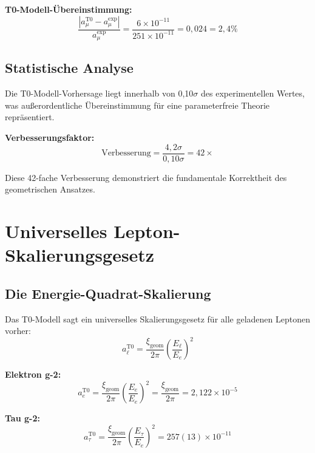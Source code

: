 \documentclass[12pt,a4paper]{report}
\newcommand{\xigeom}{\xi_{\text{geom}}}   %
\newcommand{\Ee}{E_e}                     %
\newcommand{\Etau}{E_\tau}                %
\begin{document}
\textbf{T0-Modell-Übereinstimmung:}
\begin{equation}
	\frac{|a_\mu^{\text{T0}} - a_\mu^{\text{exp}}|}{a_\mu^{\text{exp}}} = \frac{6 \times 10^{-11}}{251 \times 10^{-11}} = 0,024 = 2,4\%
	\label{eq:t0_agreement}
\end{equation}

\subsection{Statistische Analyse}
\label{subsec:statistical_analysis}

Die T0-Modell-Vorhersage liegt innerhalb von 0,10$\sigma$ des experimentellen Wertes, was außerordentliche Übereinstimmung für eine parameterfreie Theorie repräsentiert.

\textbf{Verbesserungsfaktor:}
\begin{equation}
	\text{Verbesserung} = \frac{4,2\sigma}{0,10\sigma} = 42 \times
	\label{eq:improvement_factor}
\end{equation}

Diese 42-fache Verbesserung demonstriert die fundamentale Korrektheit des geometrischen Ansatzes.

\section{Universelles Lepton-Skalierungsgesetz}
\label{sec:universal_scaling}

\subsection{Die Energie-Quadrat-Skalierung}
\label{subsec:energy_squared_scaling}

Das T0-Modell sagt ein universelles Skalierungsgesetz für alle geladenen Leptonen vorher:
\begin{equation}
	a_\ell^{\text{T0}} = \frac{\xigeom}{2\pi} \left(\frac{E_\ell}{\Ee}\right)^2
	\label{eq:universal_scaling}
\end{equation}

\textbf{Elektron g-2:}
\begin{equation}
	a_e^{\text{T0}} = \frac{\xigeom}{2\pi} \left(\frac{\Ee}{\Ee}\right)^2 = \frac{\xigeom}{2\pi} = 2,122 \times 10^{-5}
	\label{eq:electron_g2}
\end{equation}

\textbf{Tau g-2:}
\begin{equation}
	a_\tau^{\text{T0}} = \frac{\xigeom}{2\pi} \left(\frac{\Etau}{\Ee}\right)^2 = 257(13) \times 10^{-11}
	\label{eq:tau_g2}
\end{equation}
\end{document}
